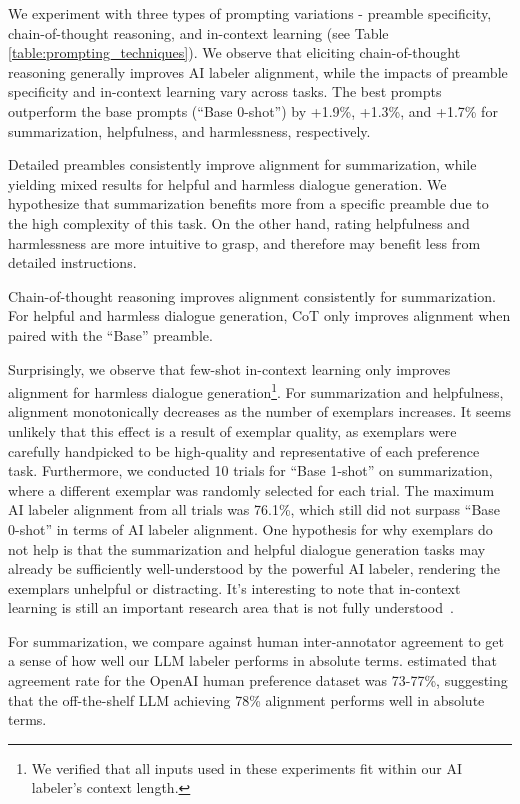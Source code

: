 \documentclass[11pt]{article}
\begin{document}
We experiment with three types of prompting variations - preamble specificity, chain-of-thought reasoning, and in-context learning (see Table \ref{table:prompting_techniques}). We observe that eliciting chain-of-thought reasoning generally improves AI labeler alignment, while the impacts of preamble specificity and in-context learning vary across tasks. The best prompts outperform the base prompts (``Base 0-shot'') by +1.9\%, +1.3\%, and +1.7\% for summarization, helpfulness, and harmlessness, respectively.

Detailed preambles consistently improve alignment for summarization, while yielding mixed results for helpful and harmless dialogue generation. We hypothesize that summarization benefits more from a specific preamble due to the high complexity of this task. On the other hand, rating helpfulness and harmlessness are more intuitive to grasp, and therefore may benefit less from detailed instructions.

Chain-of-thought reasoning improves alignment consistently for summarization. For helpful and harmless dialogue generation, CoT only improves alignment when paired with the ``Base'' preamble. 

Surprisingly, we observe that few-shot in-context learning only improves alignment for harmless dialogue generation\footnote{We verified that all inputs used in these experiments fit within our AI labeler's context length.}. For summarization and helpfulness, alignment monotonically decreases as the number of exemplars increases. It seems unlikely that this effect is a result of exemplar quality, as exemplars were carefully handpicked to be high-quality and representative of each preference task. Furthermore, we conducted 10 trials for ``Base 1-shot'' on summarization, where a different exemplar was randomly selected for each trial. The maximum AI labeler alignment from all trials was 76.1\%, which still did not surpass ``Base 0-shot'' in terms of AI labeler alignment. One hypothesis for why exemplars do not help is that the summarization and helpful dialogue generation tasks may already be sufficiently well-understood by the powerful AI labeler, rendering the exemplars unhelpful or distracting. It's interesting to note that in-context learning is still an important research area that is not fully understood~\citep{min2022rethinking,wang2022towards}.

For summarization, we compare against human inter-annotator agreement to get a sense of how well our LLM labeler performs in absolute terms. \citet{stiennon2020learning} estimated that agreement rate for the OpenAI human preference dataset was 73-77\%, suggesting that the off-the-shelf LLM achieving 78\% alignment performs well in absolute terms.
\end{document}

